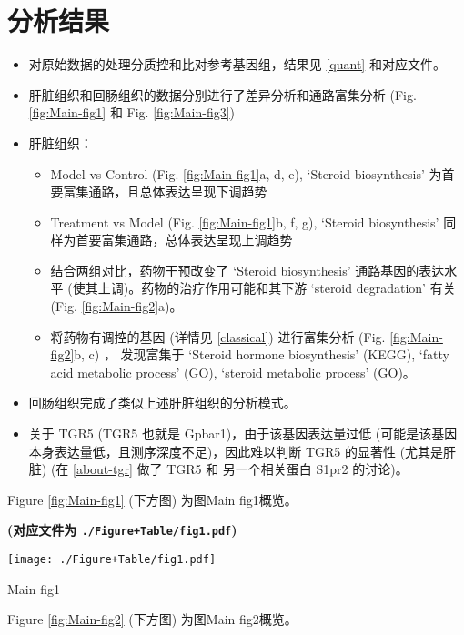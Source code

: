 \documentclass[
]{article}
\providecommand{\tightlist}{%
  \setlength{\itemsep}{0pt}\setlength{\parskip}{0pt}}
\begin{document}
\hypertarget{results}{%
\section{分析结果}\label{results}}

\begin{itemize}
\tightlist
\item
  对原始数据的处理分质控和比对参考基因组，结果见 \ref{quant} 和对应文件。
\item
  肝脏组织和回肠组织的数据分别进行了差异分析和通路富集分析 (Fig. \ref{fig:Main-fig1} 和 Fig. \ref{fig:Main-fig3})
\item
  肝脏组织：

  \begin{itemize}
  \tightlist
  \item
    Model vs Control (Fig. \ref{fig:Main-fig1}a, d, e), `Steroid biosynthesis' 为首要富集通路，且总体表达呈现下调趋势
  \item
    Treatment vs Model (Fig. \ref{fig:Main-fig1}b, f, g), `Steroid biosynthesis' 同样为首要富集通路，总体表达呈现上调趋势
  \item
    结合两组对比，药物干预改变了 `Steroid biosynthesis' 通路基因的表达水平 (使其上调)。药物的治疗作用可能和其下游 `steroid degradation' 有关 (Fig. \ref{fig:Main-fig2}a)。
  \item
    将药物有调控的基因 (详情见 \ref{classical}) 进行富集分析 (Fig. \ref{fig:Main-fig2}b, c) ，
    发现富集于 `Steroid hormone biosynthesis' (KEGG),
    `fatty acid metabolic process' (GO), `steroid metabolic process' (GO)。
  \end{itemize}
\item
  回肠组织完成了类似上述肝脏组织的分析模式。
\item
  关于 TGR5 (TGR5 也就是 Gpbar1)，由于该基因表达量过低 (可能是该基因本身表达量低，且测序深度不足)，因此难以判断 TGR5 的显著性 (尤其是肝脏) (在 \ref{about-tgr} 做了 TGR5 和 另一个相关蛋白 S1pr2 的讨论)。
\end{itemize}

Figure \ref{fig:Main-fig1} (下方图) 为图Main fig1概览。

\textbf{(对应文件为 \texttt{./Figure+Table/fig1.pdf})}

\def\@captype{figure}
\begin{center}
\texttt{[image: ./Figure+Table/fig1.pdf]}
\caption{Main fig1}\label{fig:Main-fig1}
\end{center}

Figure \ref{fig:Main-fig2} (下方图) 为图Main fig2概览。
\end{document}
